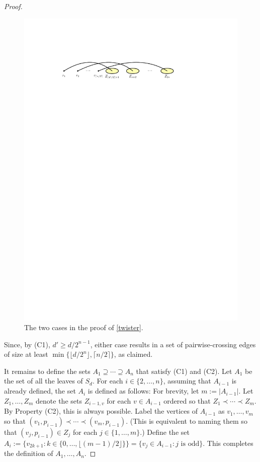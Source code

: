 \documentclass[kpfonts]{patmorin}
\renewcommand{\ge}{\geqslant}
\begin{document}
\begin{proof}
\begin{figure}[!h]
			\includegraphics{figs/median-2}
		\caption{The two cases in the proof of \cref{twister}.}
	\end{figure}
	Since, by (C1), $d'\ge d/2^{n-1}$, either case results in a set of pairwise-crossing edges of size at least $\min\{\lfloor d/2^n\rfloor,\lceil n/2\rceil\}$, as claimed.
	
    It remains to define the sets $A_1\supseteq\cdots\supseteq A_n$ that satisfy (C1) and (C2).  Let $A_1$ be the set of all the leaves of $S_d$.  For each $i\in\{2,\ldots,n\}$, assuming that $A_{i-1}$ is already defined, the set $A_i$ is defined as follows: For brevity, let $m:= |A_{i-1}|$. Let $Z_1,\ldots,Z_m$ denote the sets $Z_{i-1, v}$ for each $v\in A_{i-1}$ ordered so that $Z_1\prec\cdots\prec Z_m$. By Property (C2), this is always possible. Label the vertices of $A_{i-1}$ as $v_1,\ldots,v_m$ so that $(v_1,p_{i-1})\prec\cdots\prec (v_m  ,p_{i-1})$.   (This is equivalent to naming them so that $(v_j,p_{i-1})\in Z_j$ for each $j\in\{1,\ldots,m\}$.)  Define the set $A_i:=\{v_{2k+1}:k\in\{0,\ldots,\lfloor(m-1)/2\rfloor\}\}=\{v_{j}\in A_{i-1}:\text{$j$ is odd}\}$.  This completes the definition of $A_1,\ldots,A_n$.


\end{proof}
\end{document}

